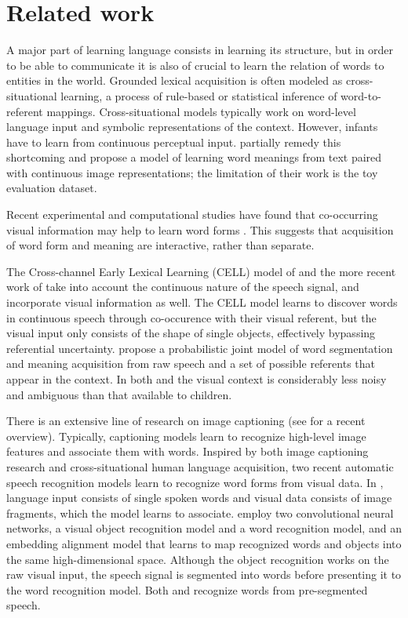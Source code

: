 \section{Related work}
A major part of learning language consists in learning its structure,
but in order to be able to communicate it is also of crucial
to learn the relation of words to entities in the
world. %
Grounded lexical acquisition is often modeled as cross-situational
learning, a process of rule-based \cite{siskind.96} or statistical
\cite{fazly.etal.10csj,frank.etal.07} inference of word-to-referent
mappings.
Cross-situational models typically work on word-level language input
and symbolic representations of the context. However, infants have to
learn from continuous perceptual input. 
 partially remedy this shortcoming
and propose a model of learning word
meanings from text paired with continuous image representations; the
limitation of their work is the toy evaluation dataset.

Recent experimental and computational studies have found that co-occurring visual information may help to learn word forms \cite{thiessen2010effects,Cunillera2010295,Glicksohn2013,Yurofsky2012statistical}. This suggests that acquisition of word form and meaning are interactive, rather than separate.

The Cross-channel Early Lexical Learning (CELL) model of  and the more recent work of  take into account the continuous nature of the speech signal, and incorporate visual information as well. The CELL model learns to discover words in continuous speech through co-occurence with their visual referent, but the visual input only consists of the shape of single objects, effectively bypassing referential uncertainty.  propose a probabilistic joint model of word segmentation and meaning acquisition from raw speech and a set of possible referents that appear in the context. In both  and  the visual context is considerably less noisy and ambiguous than that available to children.

There is an extensive line of research on image captioning (see  for a recent overview). Typically, captioning models learn to recognize high-level image features and associate them with words. Inspired by both image captioning research and cross-situational human language acquisition, two recent automatic speech recognition models learn to recognize word forms from visual data. In , language input consists of single spoken words and visual data consists of image fragments, which the model learns to associate.  employ two convolutional neural networks, a visual object recognition model and a word recognition model, and an embedding alignment model that learns to map recognized words and objects into the same high-dimensional space. Although the object recognition works on the raw visual input, the speech signal is segmented into words before presenting it to the word recognition model. Both  and  recognize words from pre-segmented speech.

